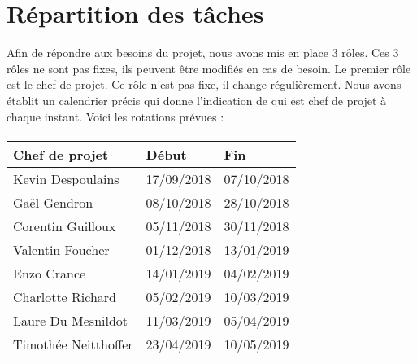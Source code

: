 \section{Répartition des tâches}

Afin de répondre aux besoins du projet, nous avons mis en place 3 rôles. Ces 3 rôles ne sont pas fixes,
ils peuvent être modifiés en cas de besoin. Le premier rôle est le chef de projet. Ce rôle n’est pas fixe,
il change régulièrement. Nous avons établit un calendrier précis qui donne l’indication de qui
est chef de projet à chaque instant. Voici les rotations prévues :

\paragraph{}
\begin{tabular}{ | l | l | l | }
\hline
{\textbf{Chef de projet}}   &   {\textbf{Début}}    &   {\textbf{Fin}}  \\ \hline
{Kevin Despoulains}         &   {17/09/2018}        &	{07/10/2018}    \\ \hline
{Gaël Gendron}              &   {08/10/2018}	    &	{28/10/2018}    \\ \hline
{Corentin Guilloux}         &   {05/11/2018}	    &	{30/11/2018}    \\ \hline
{Valentin Foucher}          &   {01/12/2018}	    &	{13/01/2019}    \\ \hline
{Enzo Crance}               &   {14/01/2019}	    &	{04/02/2019}    \\ \hline
{Charlotte Richard}         &   {05/02/2019}	    &	{10/03/2019}    \\ \hline
{Laure Du Mesnildot}        &   {11/03/2019}	    &	{05/04/2019}    \\ \hline
{Timothée Neitthoffer}      &	{23/04/2019}	    &	{10/05/2019}    \\ \hline
\end{tabular}
    
